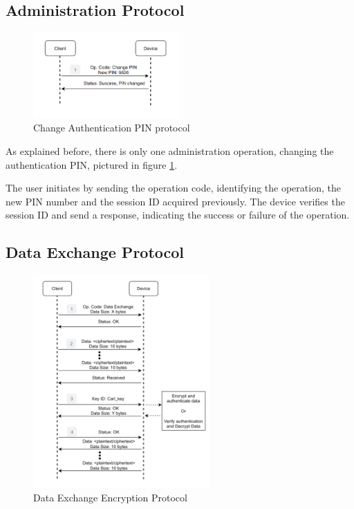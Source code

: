 \subsection{Administration Protocol} \label{chap:sol:protocol:admin}
\begin{figure}[h]
	\centering
	\includegraphics[width=0.5\textwidth]{./Images/change-PIN.png}
	\caption{Change Authentication PIN protocol}
	\label{fig:protocol:change-PIN}
\end{figure}

As explained before, there is only one administration operation, changing the authentication PIN, pictured in figure \ref{fig:protocol:change-PIN}.

The user initiates by sending the operation code, identifying the operation, the new PIN number and the session ID acquired previously. The device verifies the session ID and send a response, indicating the success or failure of the operation.

\subsection{Data Exchange Protocol} \label{chap:sol:protocol:data}

\begin{figure}[h]
	\centering
	\includegraphics[width=0.6\textwidth]{./Images/data-exchange.png}
	\caption{Data Exchange Encryption Protocol}
	\label{fig:protocol:data-exchange}
\end{figure}

